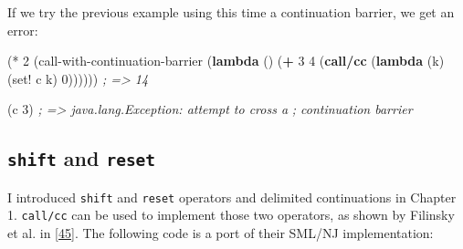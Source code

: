 \documentclass[12pt,a4paper,oneside,openright]{book}
\newenvironment{Shaded}{\begin{snugshade}}{\end{snugshade}}
\newcommand{\KeywordTok}[1]{\textcolor[rgb]{0.13,0.29,0.53}{\textbf{{#1}}}}
\newcommand{\DecValTok}[1]{\textcolor[rgb]{0.00,0.00,0.81}{{#1}}}
\newcommand{\CommentTok}[1]{\textcolor[rgb]{0.56,0.35,0.01}{\textit{{#1}}}}
\newcommand{\NormalTok}[1]{{#1}}
\begin{document}
If we try the previous example using this time a continuation barrier,
we get an error:

\begin{Shaded}
\begin{Highlighting}[]
    \NormalTok{(* }\DecValTok{2}
      \NormalTok{(call-with-continuation-barrier}
        \NormalTok{(}\KeywordTok{lambda} \NormalTok{()}
          \NormalTok{(}\KeywordTok{+} \DecValTok{3} \DecValTok{4}
            \NormalTok{(}\KeywordTok{call/cc}
              \NormalTok{(}\KeywordTok{lambda} \NormalTok{(k)}
                \NormalTok{(set! c k)}
                \DecValTok{0}\NormalTok{)))))) }\CommentTok{; => 14}
\end{Highlighting}
\end{Shaded}

\begin{Shaded}
\begin{Highlighting}[]
    \NormalTok{(c }\DecValTok{3}\NormalTok{) }\CommentTok{; => java.lang.Exception: attempt to cross a}
          \CommentTok{;                          continuation barrier}
\end{Highlighting}
\end{Shaded}

\subsection{\texorpdfstring{\texttt{shift} and
\texttt{reset}}{shift and reset}}\label{shift-and-reset}

I introduced \texttt{shift} and \texttt{reset} operators and delimited
continuations in Chapter 1. \texttt{call/cc} can be used to implement
those two operators, as shown by Filinsky et al. in
{[}\hyperref[ref-Filinski1994]{45}{]}. The following code is a port of
their SML/NJ implementation:
\end{document}
